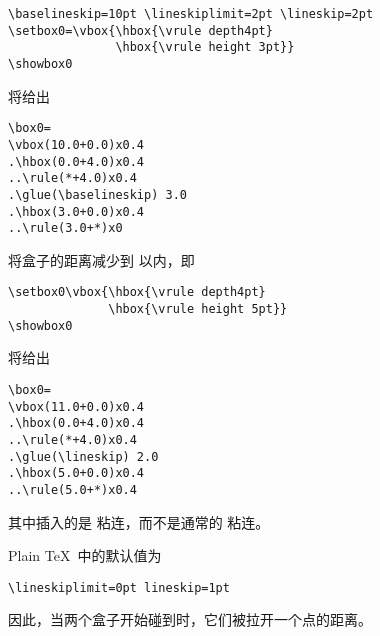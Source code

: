 \documentclass{book}
\begin{document}
\begin{example}
\begin{verbatim}
\baselineskip=10pt \lineskiplimit=2pt \lineskip=2pt
\setbox0=\vbox{\hbox{\vrule depth4pt}
               \hbox{\vrule height 3pt}}
\showbox0
\end{verbatim}
将给出
\begin{verbatim}
\box0=
\vbox(10.0+0.0)x0.4
.\hbox(0.0+4.0)x0.4
..\rule(*+4.0)x0.4
.\glue(\baselineskip) 3.0
.\hbox(3.0+0.0)x0.4
..\rule(3.0+*)x0
\end{verbatim}
将盒子的距离减少到  以内，即
\begin{verbatim}
\setbox0\vbox{\hbox{\vrule depth4pt}
              \hbox{\vrule height 5pt}}
\showbox0
\end{verbatim}
将给出
\begin{verbatim}
\box0=
\vbox(11.0+0.0)x0.4
.\hbox(0.0+4.0)x0.4
..\rule(*+4.0)x0.4
.\glue(\lineskip) 2.0
.\hbox(5.0+0.0)x0.4
..\rule(5.0+*)x0.4
\end{verbatim}
其中插入的是  粘连，而不是通常的  粘连。
\end{example}

Plain \TeX\ 中的默认值为
\begin{verbatim}
\lineskiplimit=0pt lineskip=1pt
\end{verbatim}
因此，当两个盒子开始碰到时，它们被拉开一个点的距离。
\end{document}
